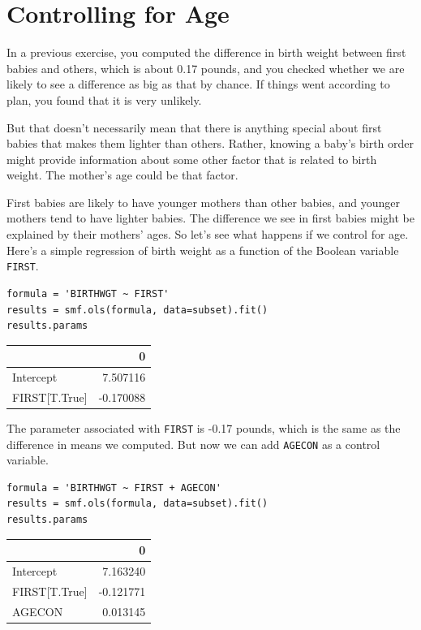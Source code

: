 \hypertarget{controlling-for-age}{%
\section{Controlling for Age}\label{controlling-for-age}}

In a previous exercise, you computed the difference in birth weight
between first babies and others, which is about 0.17 pounds, and you
checked whether we are likely to see a difference as big as that by
chance. If things went according to plan, you found that it is very
unlikely.

But that doesn't necessarily mean that there is anything special about
first babies that makes them lighter than others. Rather, knowing a
baby's birth order might provide information about some other factor
that is related to birth weight. The mother's age could be that factor.

First babies are likely to have younger mothers than other babies, and
younger mothers tend to have lighter babies. The difference we see in
first babies might be explained by their mothers' ages. So let's see
what happens if we control for age. Here's a simple regression of birth
weight as a function of the Boolean variable
\passthrough{\lstinline!FIRST!}.

\begin{lstlisting}[]
formula = 'BIRTHWGT ~ FIRST'
results = smf.ols(formula, data=subset).fit()
results.params
\end{lstlisting}

\begin{tabular}{lr}
\midrule
{} &         0 \\
\midrule
Intercept     &  7.507116 \\
FIRST[T.True] & -0.170088 \\
\midrule
\end{tabular}

The parameter associated with \passthrough{\lstinline!FIRST!} is -0.17
pounds, which is the same as the difference in means we computed. But
now we can add \passthrough{\lstinline!AGECON!} as a control variable.

\begin{lstlisting}[]
formula = 'BIRTHWGT ~ FIRST + AGECON'
results = smf.ols(formula, data=subset).fit()
results.params
\end{lstlisting}

\begin{tabular}{lr}
\midrule
{} &         0 \\
\midrule
Intercept     &  7.163240 \\
FIRST[T.True] & -0.121771 \\
AGECON        &  0.013145 \\
\midrule
\end{tabular}

